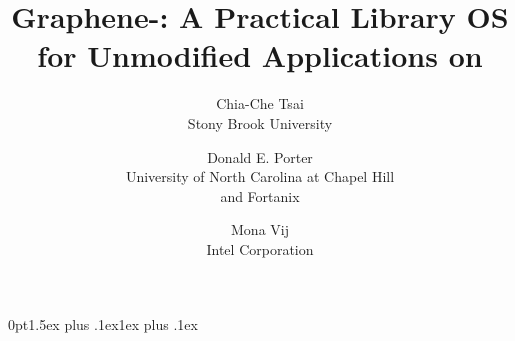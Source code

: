 \documentclass[letterpaper,twocolumn,10pt]{article}
\begin{document}

\def\longconferencenames{}


\title{Graphene-\sgx{}: A Practical Library OS for Unmodified Applications on \sgx{}}

\author{
{\rm Chia-Che Tsai}\\
Stony Brook University
\and
{\rm Donald E. Porter}\\
University of North Carolina at Chapel Hill \\ and Fortanix
\and
{\rm Mona Vij}\\
Intel Corporation
} %

\date{\vspace{-4ex}} %

\newcommand{\subtitle}[1]{%
  \posttitle{%
    \par\end{center}
    \begin{center}\large#1\end{center}
    \vskip0.5em}%
}


\maketitle



\titleformat{\papersection}[block]{
  \fontsize{12}{15}\bfseries}{%
  \thesection}{%
  1em}{%
  }{%
  }%
  
\titlespacing*{\papersection}
{0pt}{1.5ex plus .1ex}{1ex plus .1ex}

\titleformat{\papersubsection}[block]{
  \fontsize{12}{14}\bfseries}{%
  \thesubsection}{%
  1em}{%
  }{%
  }%
  
\end{document}
